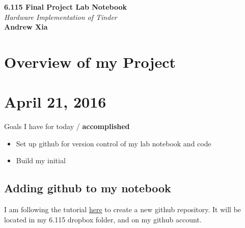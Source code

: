 \documentclass[12pt,twoside]{article}
\newcommand{\andrew}{Andrew Xia}
\newcommand{\name}{6.115 Final Project Lab Notebook}
\begin{document}
 
\begin{center} {\bf \Large \name}
\\ \emph{Hardware Implementation of Tinder}
\\ {\bf \andrew}
\end{center}
\section{Overview of my Project}


\section{April 21, 2016}
Goals I have for today / {\bf accomplished}
\begin{itemize}
\item Set up github for version control of my lab notebook and code
\item Build my initial 
\end{itemize}

\subsection{Adding github to my notebook}
I am following the tutorial \href{https://help.github.com/articles/adding-an-existing-project-to-github-using-the-command-line/}{here} to create a new github repository. It will be located in my 6.115 dropbox folder, and on my github account. 
\end{document}
